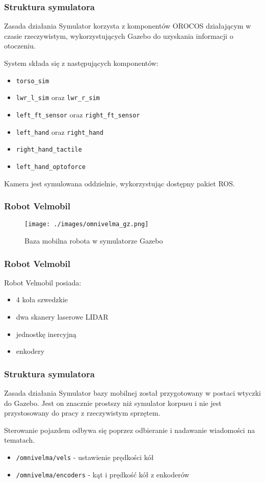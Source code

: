 \begin{frame}
\frametitle{Struktura symulatora}
\begin{block}{Zasada działania}
	Symulator korzysta z komponentów OROCOS działającym w czasie rzeczywistym, wykorzystujących Gazebo
	do uzyskania informacji o otoczeniu.
\end{block}
\medskip
System składa się z następujących komponentów:
\begin{itemize}
	\item \texttt{torso\_{}sim}
	\item \texttt{lwr\_{}l\_{}sim} oraz \texttt{lwr\_{}r\_{}sim}
	\item \texttt{left\_{}ft\_{}sensor} oraz \texttt{right\_{}ft\_{}sensor}
	\item \texttt{left\_{}hand} oraz \texttt{right\_{}hand}
	\item \texttt{right\_{}hand\_{}tactile}
	\item \texttt{left\_{}hand\_{}optoforce}
\end{itemize}
Kamera jest symulowana oddzielnie, wykorzystując dostępny pakiet ROS.
\end{frame}


\begin{frame}
\frametitle{Robot Velmobil}
\begin{figure}
\texttt{[image: ./images/omnivelma\_gz.png]}
\caption{Baza mobilna robota w symulatorze Gazebo}
\end{figure}
\end{frame}


\begin{frame}
\frametitle{Robot Velmobil}
Robot Velmobil posiada:  
\begin{itemize}
	\item 4 koła szwedzkie
	\item dwa skanery laserowe LIDAR
	\item jednostkę inercyjną
	\item enkodery %
\end{itemize}
\end{frame}


\begin{frame}
\frametitle{Struktura symulatora}
\begin{block}{Zasada działania}
Symulator bazy mobilnej został przygotowany w postaci wtyczki do Gazebo. 
Jest on znacznie prostszy niż symulator korpusu i nie jest przystosowany
do pracy z rzeczywistym sprzętem.
\end{block}
\bigskip
Sterowanie pojazdem
odbywa się poprzez odbieranie i nadawanie wiadomości na tematach.
\begin{itemize}
	\item \texttt{/omnivelma/vels} - ustawienie prędkości kół
	\item \texttt{/omnivelma/encoders} - kąt i prędkość kół z enkoderów
\end{itemize}
\end{frame}